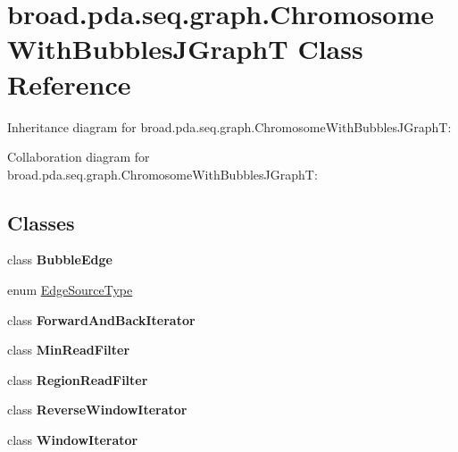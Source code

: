 \hypertarget{classbroad_1_1pda_1_1seq_1_1graph_1_1_chromosome_with_bubbles_j_graph_t}{\section{broad.\+pda.\+seq.\+graph.\+Chromosome\+With\+Bubbles\+J\+Graph\+T Class Reference}
\label{classbroad_1_1pda_1_1seq_1_1graph_1_1_chromosome_with_bubbles_j_graph_t}
}


Inheritance diagram for broad.\+pda.\+seq.\+graph.\+Chromosome\+With\+Bubbles\+J\+Graph\+T\+:


Collaboration diagram for broad.\+pda.\+seq.\+graph.\+Chromosome\+With\+Bubbles\+J\+Graph\+T\+:
\subsection*{Classes}
\begin{DoxyCompactItemize}
\item 
class {\bfseries Bubble\+Edge}
\item 
enum \hyperlink{enumbroad_1_1pda_1_1seq_1_1graph_1_1_chromosome_with_bubbles_j_graph_t_1_1_edge_source_type}{Edge\+Source\+Type}
\item 
class {\bfseries Forward\+And\+Back\+Iterator}
\item 
class {\bfseries Min\+Read\+Filter}
\item 
class {\bfseries Region\+Read\+Filter}
\item 
class {\bfseries Reverse\+Window\+Iterator}
\item 
class {\bfseries Window\+Iterator}
\end{DoxyCompactItemize}
